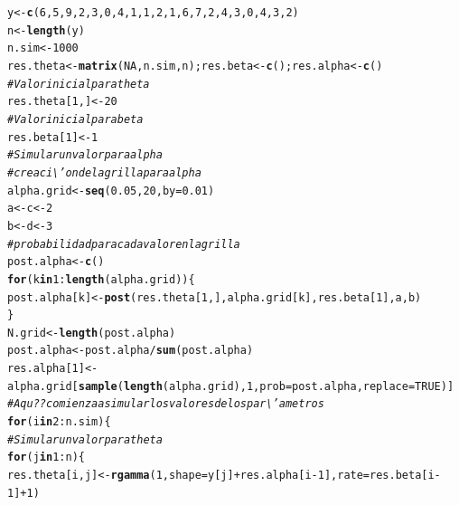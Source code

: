 \documentclass[10pt,openright]{book}\usepackage[]{graphicx}\usepackage[]{color}
\makeatletter
\newcommand{\hlnum}[1]{\textcolor[rgb]{0.686,0.059,0.569}{#1}}%
\newcommand{\hlcom}[1]{\textcolor[rgb]{0.678,0.584,0.686}{\textit{#1}}}%
\newcommand{\hlopt}[1]{\textcolor[rgb]{0,0,0}{#1}}%
\newcommand{\hlstd}[1]{\textcolor[rgb]{0.345,0.345,0.345}{#1}}%
\newcommand{\hlkwa}[1]{\textcolor[rgb]{0.161,0.373,0.58}{\textbf{#1}}}%
\newcommand{\hlkwb}[1]{\textcolor[rgb]{0.69,0.353,0.396}{#1}}%
\newcommand{\hlkwc}[1]{\textcolor[rgb]{0.333,0.667,0.333}{#1}}%
\newcommand{\hlkwd}[1]{\textcolor[rgb]{0.737,0.353,0.396}{\textbf{#1}}}%
\newenvironment{kframe}{%
 \def\at@end@of@kframe{}%
 \ifinner\ifhmode%
  \def\at@end@of@kframe{\end{minipage}}%
  \begin{minipage}{\columnwidth}%
 \fi\fi%
 \def\FrameCommand##1{\hskip\@totalleftmargin \hskip-\fboxsep
 \colorbox{shadecolor}{##1}\hskip-\fboxsep
     \hskip-\linewidth \hskip-\@totalleftmargin \hskip\columnwidth}%
 \MakeFramed {\advance\hsize-\width
   \@totalleftmargin\z@ \linewidth\hsize
   \@setminipage}}%
 {\par\unskip\endMakeFramed%
 \at@end@of@kframe}
\newenvironment{knitrout}{}{} %
\makeatother
\begin{document}
\begin{knitrout}
\color{fgcolor}\begin{kframe}
\begin{alltt}
\hlstd{y} \hlkwb{<-} \hlkwd{c}\hlstd{(}\hlnum{6}\hlstd{,} \hlnum{5}\hlstd{,} \hlnum{9}\hlstd{,} \hlnum{2}\hlstd{,} \hlnum{3}\hlstd{,} \hlnum{0}\hlstd{,} \hlnum{4}\hlstd{,} \hlnum{1}\hlstd{,} \hlnum{1}\hlstd{,} \hlnum{2}\hlstd{,} \hlnum{1}\hlstd{,} \hlnum{6}\hlstd{,} \hlnum{7}\hlstd{,} \hlnum{2}\hlstd{,} \hlnum{4}\hlstd{,} \hlnum{3}\hlstd{,} \hlnum{0}\hlstd{,} \hlnum{4}\hlstd{,} \hlnum{3}\hlstd{,} \hlnum{2}\hlstd{)}
\hlstd{n} \hlkwb{<-} \hlkwd{length}\hlstd{(y)}
\hlstd{n.sim} \hlkwb{<-} \hlnum{1000}
\hlstd{res.theta} \hlkwb{<-} \hlkwd{matrix}\hlstd{(}\hlnum{NA}\hlstd{,n.sim,n); res.beta} \hlkwb{<-} \hlkwd{c}\hlstd{(); res.alpha} \hlkwb{<-} \hlkwd{c}\hlstd{()}
\hlcom{# Valor inicial para theta}
\hlstd{res.theta[}\hlnum{1}\hlstd{,]} \hlkwb{<-} \hlnum{20}
\hlcom{# Valor inicial para beta}
\hlstd{res.beta[}\hlnum{1}\hlstd{]} \hlkwb{<-} \hlnum{1}
\hlcom{# Simular un valor para alpha}
 \hlcom{# creaci\textbackslash{}'on de la grilla para alpha}
 \hlstd{alpha.grid} \hlkwb{<-} \hlkwd{seq}\hlstd{(}\hlnum{0.05}\hlstd{,} \hlnum{20}\hlstd{,} \hlkwc{by}\hlstd{=}\hlnum{0.01}\hlstd{)}
 \hlstd{a} \hlkwb{<-} \hlstd{c} \hlkwb{<-} \hlnum{2}
 \hlstd{b} \hlkwb{<-} \hlstd{d} \hlkwb{<-} \hlnum{3}
 \hlcom{# probabilidad para cada valor en la grilla}
 \hlstd{post.alpha} \hlkwb{<-} \hlkwd{c}\hlstd{()}
 \hlkwa{for}\hlstd{(k} \hlkwa{in} \hlnum{1}\hlopt{:}\hlkwd{length}\hlstd{(alpha.grid))\{}
  \hlstd{post.alpha[k]} \hlkwb{<-} \hlkwd{post}\hlstd{(res.theta[}\hlnum{1}\hlstd{,], alpha.grid[k], res.beta[}\hlnum{1}\hlstd{],a,b)}
 \hlstd{\}}
 \hlstd{N.grid} \hlkwb{<-} \hlkwd{length}\hlstd{(post.alpha)}
 \hlstd{post.alpha} \hlkwb{<-} \hlstd{post.alpha}\hlopt{/}\hlkwd{sum}\hlstd{(post.alpha)}
 \hlstd{res.alpha[}\hlnum{1}\hlstd{]} \hlkwb{<-} \hlstd{alpha.grid[}\hlkwd{sample}\hlstd{(}\hlkwd{length}\hlstd{(alpha.grid),} \hlnum{1}\hlstd{,} \hlkwc{prob}\hlstd{=post.alpha,} \hlkwc{replace}\hlstd{=}\hlnum{TRUE}\hlstd{)]}
 \hlcom{# Aqu?? comienza a simular los valores de los par\textbackslash{}'ametros}
 \hlkwa{for}\hlstd{(i} \hlkwa{in} \hlnum{2}\hlopt{:}\hlstd{n.sim)\{}
 \hlcom{# Simular un valor para theta}
   \hlkwa{for}\hlstd{(j} \hlkwa{in} \hlnum{1}\hlopt{:}\hlstd{n)\{}
     \hlstd{res.theta[i,j]} \hlkwb{<-} \hlkwd{rgamma}\hlstd{(}\hlnum{1}\hlstd{,} \hlkwc{shape}\hlstd{=y[j]}\hlopt{+}\hlstd{res.alpha[i}\hlopt{-}\hlnum{1}\hlstd{],} \hlkwc{rate}\hlstd{=res.beta[i}\hlopt{-}\hlnum{1}\hlstd{]}\hlopt{+}\hlnum{1}\hlstd{)}

\end{alltt}
\end{kframe}
\end{knitrout}
\end{document}
